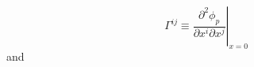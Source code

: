 \begin{equation}
\Gamma^{ij} \equiv \left. \frac{\partial^2 \phi_p}{\partial x^i \partial x^j} \right|_{x=0}
\end{equation}
and